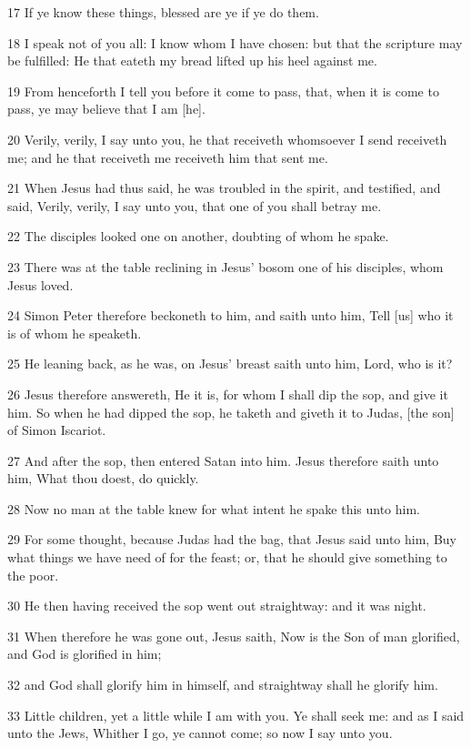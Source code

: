 \par 17 If ye know these things, blessed are ye if ye do them.
\par 18 I speak not of you all: I know whom I have chosen: but that the scripture may be fulfilled: He that eateth my bread lifted up his heel against me.
\par 19 From henceforth I tell you before it come to pass, that, when it is come to pass, ye may believe that I am [he].
\par 20 Verily, verily, I say unto you, he that receiveth whomsoever I send receiveth me; and he that receiveth me receiveth him that sent me.
\par 21 When Jesus had thus said, he was troubled in the spirit, and testified, and said, Verily, verily, I say unto you, that one of you shall betray me.
\par 22 The disciples looked one on another, doubting of whom he spake.
\par 23 There was at the table reclining in Jesus' bosom one of his disciples, whom Jesus loved.
\par 24 Simon Peter therefore beckoneth to him, and saith unto him, Tell [us] who it is of whom he speaketh.
\par 25 He leaning back, as he was, on Jesus' breast saith unto him, Lord, who is it?
\par 26 Jesus therefore answereth, He it is, for whom I shall dip the sop, and give it him. So when he had dipped the sop, he taketh and giveth it to Judas, [the son] of Simon Iscariot.
\par 27 And after the sop, then entered Satan into him. Jesus therefore saith unto him, What thou doest, do quickly.
\par 28 Now no man at the table knew for what intent he spake this unto him.
\par 29 For some thought, because Judas had the bag, that Jesus said unto him, Buy what things we have need of for the feast; or, that he should give something to the poor.
\par 30 He then having received the sop went out straightway: and it was night.
\par 31 When therefore he was gone out, Jesus saith, Now is the Son of man glorified, and God is glorified in him;
\par 32 and God shall glorify him in himself, and straightway shall he glorify him.
\par 33 Little children, yet a little while I am with you. Ye shall seek me: and as I said unto the Jews, Whither I go, ye cannot come; so now I say unto you.
